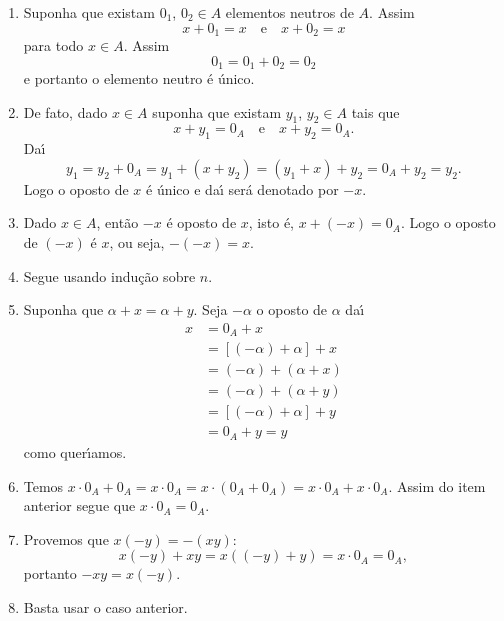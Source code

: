 \begin{prova}
    \begin{enumerate}[label={\roman*})]
        \item Suponha que existam $0_1$, $0_2\in A$ elementos neutros de $A$. Assim
        \[
            x + 0_1 = x \quad \mbox{e}\quad x + 0_2 = x
        \]
        para todo $x \in A$. Assim
        \[
            0_1 = 0_1 + 0_2 = 0_2
        \]
        e portanto o elemento neutro \'e \'unico.

        \item De fato, dado $x \in A$ suponha que existam $y_1$, $y_2\in A$ tais que
        \[
            x + y_1 = 0_A \quad \mbox{e}\quad x + y_2 = 0_A.
        \]
        Da{\'\i}
        \[
            y_1 = y_2 + 0_A = y_1 + (x + y_2) = (y_1 + x) + y_2 = 0_A + y_2 =y_2.
        \]
        Logo o oposto de $x$ \'e \'unico  e da{\'\i} ser\'a denotado por $-x$.

        \item Dado $x \in A$, ent\~ao $-x$ {\'e} oposto de $x$, isto {\'e}, $x + (-x) = 0_A$. Logo o oposto de $(-x)$ {\'e} $x$, ou seja, $-(-x) = x$.

        \item Segue usando indu\c{c}\~ao sobre $n$.

        \item Suponha que $\alpha + x = \alpha + y$. Seja $-\alpha$ o oposto de $\alpha$ da{\'\i}
        \begin{align*}
            x &= 0_A + x \\ &= [(-\alpha) + \alpha] + x\\ &= (-\alpha) + (\alpha + x) \\ &= (-\alpha) + (\alpha + y) \\ &= [(-\alpha) + \alpha] + y \\ &= 0_A + y = y
        \end{align*}
        como quer{\'\i}amos.

        \item Temos $x\cdot 0_A + 0_A = x\cdot 0_A = x\cdot(0_A + 0_A) = x\cdot 0_A + x\cdot 0_A$. Assim do item anterior segue que $x\cdot 0_A = 0_A$.

        \item Provemos que $x(-y) = -(xy)$:
        \[
            x(-y) + xy = x((-y) + y) = x\cdot 0_A = 0_A,
        \]
        portanto $-xy = x(-y)$.

        \item Basta usar o caso anterior.
    \end{enumerate}
\end{prova}


